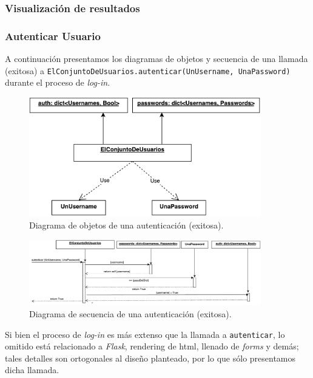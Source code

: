 \subsubsection{Visualización de resultados}

\subsubsection{Autenticar Usuario}

\par A continuación presentamos los diagramas de objetos y secuencia de una llamada (exitosa) a 
\texttt{ElConjuntoDeUsuarios.autenticar(UnUsername, UnaPassword)} durante el proceso de \textit{log-in}.

\begin{figure}[ht]
    \centering
    \includegraphics[width=0.9\textwidth]{diagramas/ObjetosLogIn.pdf}
    \caption{Diagrama de objetos de una autenticación (exitosa).}\label{ObjLogIn}
\end{figure}

\begin{figure}[ht]
    \centering
    \includegraphics[width=0.9\textwidth]{diagramas/SecuenciaLogIn.pdf}
    \caption{Diagrama de secuencia de una autenticación (exitosa).}\label{SecLogIn}
\end{figure}

\par Si bien el proceso de \textit{log-in} es más extenso que la llamada a \texttt{autenticar}, lo omitido está relacionado a \textit{Flask}, rendering de html, llenado de \textit{forms} y demás; tales detalles son ortogonales al diseño planteado, por lo que sólo presentamos dicha llamada.

